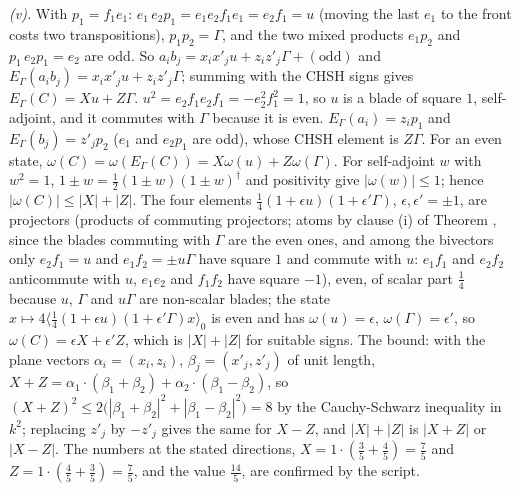 \emph{(v).} With $p_{1} = f_{1}e_{1}$: $e_{1}\,e_{2}p_{1} = e_{1}e_{2}f_{1}e_{1} = e_{2}f_{1} = u$ (moving the last $e_{1}$ to the front costs two transpositions), $p_{1}p_{2} = \Gamma$, and the two mixed products $e_{1}p_{2}$ and $p_{1}\,e_{2}p_{1} = e_{2}$ are odd. So $a_{i}b_{j} = x_{i}x'_{j}u + z_{i}z'_{j}\Gamma + (\text{odd})$ and $E_{\Gamma}(a_{i}b_{j}) = x_{i}x'_{j}u + z_{i}z'_{j}\Gamma$; summing with the CHSH signs gives $E_{\Gamma}(C) = Xu + Z\Gamma$. $u^{2} = e_{2}f_{1}e_{2}f_{1} = -e_{2}^{2}f_{1}^{2} = 1$, so $u$ is a blade of square $1$, self-adjoint, and it commutes with $\Gamma$ because it is even. $E_{\Gamma}(a_{i}) = z_{i}p_{1}$ and $E_{\Gamma}(b_{j}) = z'_{j}p_{2}$ ($e_{1}$ and $e_{2}p_{1}$ are odd), whose CHSH element is $Z\Gamma$. For an even state, $\omega(C) = \omega(E_{\Gamma}(C)) = X\omega(u) + Z\omega(\Gamma)$. For self-adjoint $w$ with $w^{2} = 1$, $1 \pm w = \tfrac12(1 \pm w)(1 \pm w)^{\dagger}$ and positivity give $|\omega(w)| \le 1$; hence $|\omega(C)| \le |X| + |Z|$. The four elements $\tfrac14(1 + \epsilon u)(1 + \epsilon'\Gamma)$, $\epsilon, \epsilon' = \pm 1$, are projectors (products of commuting projectors; atoms by clause (i) of Theorem , since the blades commuting with $\Gamma$ are the even ones, and among the bivectors only $e_{2}f_{1} = u$ and $e_{1}f_{2} = \pm u\Gamma$ have square $1$ and commute with $u$: $e_{1}f_{1}$ and $e_{2}f_{2}$ anticommute with $u$, $e_{1}e_{2}$ and $f_{1}f_{2}$ have square $-1$), even, of scalar part $\tfrac14$ because $u$, $\Gamma$ and $u\Gamma$ are non-scalar blades; the state $x \mapsto 4\langle\tfrac14(1 + \epsilon u)(1 + \epsilon'\Gamma)x\rangle_{0}$ is even and has $\omega(u) = \epsilon$, $\omega(\Gamma) = \epsilon'$, so $\omega(C) = \epsilon X + \epsilon'Z$, which is $|X| + |Z|$ for suitable signs. The bound: with the plane vectors $\alpha_{i} = (x_{i}, z_{i})$, $\beta_{j} = (x'_{j}, z'_{j})$ of unit length, $X + Z = \alpha_{1} \cdot (\beta_{1} + \beta_{2}) + \alpha_{2} \cdot (\beta_{1} - \beta_{2})$, so $(X + Z)^{2} \le 2\bigl(|\beta_{1} + \beta_{2}|^{2} + |\beta_{1} - \beta_{2}|^{2}\bigr) = 8$ by the Cauchy-Schwarz inequality in $k^{2}$; replacing $z'_{j}$ by $-z'_{j}$ gives the same for $X - Z$, and $|X| + |Z|$ is $|X + Z|$ or $|X - Z|$. The numbers at the stated directions, $X = 1 \cdot (\tfrac35 + \tfrac45) = \tfrac75$ and $Z = 1 \cdot (\tfrac45 + \tfrac35) = \tfrac75$, and the value $\tfrac{14}{5}$, are confirmed by the script.
